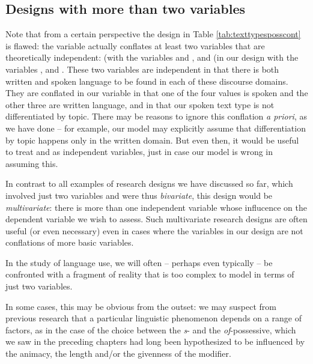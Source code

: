 \subsection{Designs with more than two variables}

Note that from a certain perspective the design in Table \ref{tab:texttypesposscont} is flawed: the variable  actually conflates at least two variables that are theoretically independent:  (with the variables  and , and  (in our design with the variables ,  and . These two variables are independent in that there is both written and spoken language to be found in each of these discourse domains. They are conflated in our variable  in that one of the four values is spoken and the other three are written language, and in that our spoken text type is not differentiated by topic. There may be reasons to ignore this conflation \textit{a priori}, as we have done -- for example, our model may explicitly assume that differentiation by topic happens only in the written domain. But even then, it would be useful to treat  and  as independent variables, just in case our model is wrong in assuming this.

In contrast to all examples of research designs we have discussed so far, which involved just two variables and were thus \textit{bivariate}, this design would be \textit{multivariate}: there is more than one independent variable whose influcence on the dependent variable we wish to assess. Such multivariate research designs are often useful (or even necessary) even in cases where the variables in our design are not conflations of more basic variables.

In the study of language use, we will often -- perhaps even typically -- be confronted with a fragment of reality that is too complex to model in terms of just two variables.

In some cases, this may be obvious from the outset: we may suspect from previous research that a particular linguistic phenomenon depends on a range of factors, as in the case of the choice between the \textit{s}- and the \textit{of}-possessive, which we saw in the preceding chapters had long been hypothesized to be influenced by the animacy, the length and/or the givenness of the modifier.

